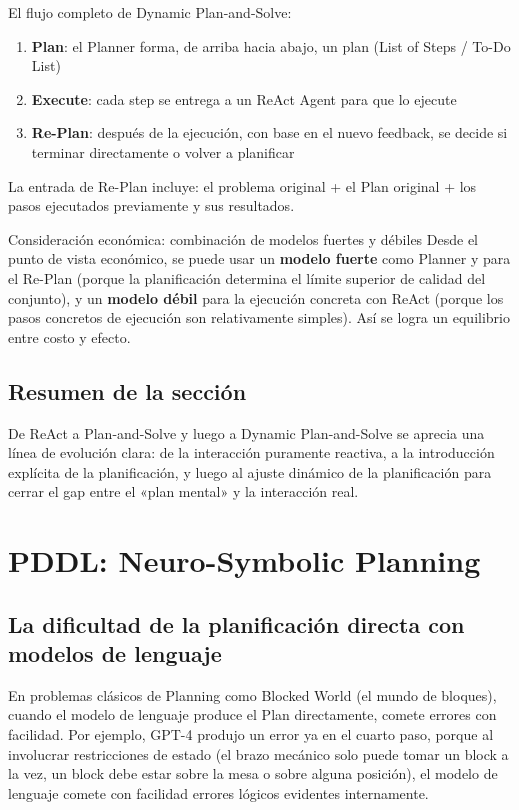 \documentclass[a4paper]{article}
\begin{document}
El flujo completo de Dynamic Plan-and-Solve:
\begin{enumerate}
    \item \textbf{Plan}: el Planner forma, de arriba hacia abajo, un plan (List of Steps / To-Do List)
    \item \textbf{Execute}: cada step se entrega a un ReAct Agent para que lo ejecute
    \item \textbf{Re-Plan}: después de la ejecución, con base en el nuevo feedback, se decide si terminar directamente o volver a planificar
\end{enumerate}

La entrada de Re-Plan incluye: el problema original + el Plan original + los pasos ejecutados previamente y sus resultados.

\begin{knowledgebox}{Consideración económica: combinación de modelos fuertes y débiles}
Desde el punto de vista económico, se puede usar un \textbf{modelo fuerte} como Planner y para el Re-Plan (porque la planificación determina el límite superior de calidad del conjunto), y un \textbf{modelo débil} para la ejecución concreta con ReAct (porque los pasos concretos de ejecución son relativamente simples). Así se logra un equilibrio entre costo y efecto.
\end{knowledgebox}

\subsection{Resumen de la sección}

De ReAct a Plan-and-Solve y luego a Dynamic Plan-and-Solve se aprecia una línea de evolución clara: de la interacción puramente reactiva, a la introducción explícita de la planificación, y luego al ajuste dinámico de la planificación para cerrar el gap entre el «plan mental» y la interacción real.


\section{PDDL: Neuro-Symbolic Planning}

\subsection{La dificultad de la planificación directa con modelos de lenguaje}

En problemas clásicos de Planning como Blocked World (el mundo de bloques), cuando el modelo de lenguaje produce el Plan directamente, comete errores con facilidad. Por ejemplo, GPT-4 produjo un error ya en el cuarto paso, porque al involucrar restricciones de estado (el brazo mecánico solo puede tomar un block a la vez, un block debe estar sobre la mesa o sobre alguna posición), el modelo de lenguaje comete con facilidad errores lógicos evidentes internamente.
\end{document}
